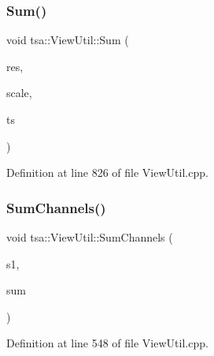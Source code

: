 \subsubsection{\texorpdfstring{Sum()}{Sum()}\hspace{0.1cm}{\footnotesize\ttfamily [2/2]}}
{\footnotesize\ttfamily void tsa\+::\+View\+Util\+::\+Sum (\begin{DoxyParamCaption}\item[{\hyperlink{namespacetsa_ab32775c889b53c40fa83939f22372b75}{Seq\+View\+Complex} \&}]{res,  }\item[{double}]{scale,  }\item[{\hyperlink{namespacetsa_ab32775c889b53c40fa83939f22372b75}{Seq\+View\+Complex} \&}]{ts }\end{DoxyParamCaption})\hspace{0.3cm}{\ttfamily [static]}}



Definition at line 826 of file View\+Util.\+cpp.

\mbox{\label{classtsa_1_1_view_util_ae115581e15bfd8b5039e88a0685580b2}} 
\subsubsection{\texorpdfstring{Sum\+Channels()}{SumChannels()}\hspace{0.1cm}{\footnotesize\ttfamily [1/2]}}
{\footnotesize\ttfamily void tsa\+::\+View\+Util\+::\+Sum\+Channels (\begin{DoxyParamCaption}\item[{\hyperlink{namespacetsa_ac599574bcc094eda25613724b8f3ca9e}{Seq\+View\+Double} \&}]{s1,  }\item[{\hyperlink{namespacetsa_ac599574bcc094eda25613724b8f3ca9e}{Seq\+View\+Double} \&}]{sum }\end{DoxyParamCaption})\hspace{0.3cm}{\ttfamily [static]}}



Definition at line 548 of file View\+Util.\+cpp.

\mbox{\label{classtsa_1_1_view_util_a5e5e15a409ca42fa35967f682fd73894}} 
